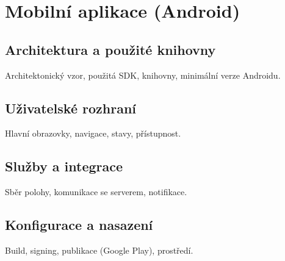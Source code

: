 \chapter{Mobilní aplikace (Android)}
\label{chap:apk}

\section{Architektura a použité knihovny}
Architektonický vzor, použitá SDK, knihovny, minimální verze Androidu.

\section{Uživatelské rozhraní}
Hlavní obrazovky, navigace, stavy, přístupnost.

\section{Služby a integrace}
Sběr polohy, komunikace se serverem, notifikace.

\section{Konfigurace a nasazení}
Build, signing, publikace (Google Play), prostředí.
